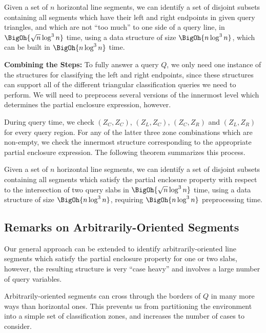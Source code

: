 \begin{lemma}
\label{lem:slabs:two:step3}
Given a set of $n$ horizontal line segments, we can identify a set of disjoint subsets containing all segments which have their left and right endpoints in given query triangles, and which are not ``too much'' to one side of a query line, in $\BigOh{\sqrt{n}\log^3{n}}$ time, using a data structure of size $\BigOh{n\log^3{n}}$, which can be built in $\BigOh{n\log^3{n}}$ time.
\end{lemma}


{\bf Combining the Steps:}
To fully answer a query $Q$, we only need one instance of the structures for classifying the left and right endpoints, since these structures can support all of the different triangular classification queries we need to perform.
We will need to preprocess several versions of the innermost level which determines the partial enclosure expression, however.

During query time, we check $(Z_C, Z_C)$, $(Z_L, Z_C)$, $(Z_C, Z_R)$ and $(Z_L, Z_R)$ for every query region. 
For any of the latter three zone combinations which are non-empty, we check the innermost structure corresponding to the appropriate partial enclosure expression.
The following theorem summarizes this process.

\begin{theorem}
\label{th:slabs:two}
Given a set of $n$ horizontal line segments, we can identify a set of disjoint subsets containing all segments which satisfy the partial enclosure property with respect to the intersection of two query slabs in $\BigOh{\sqrt{n}\log^3{n}}$ time, using a data structure of size $\BigOh{n\log^3{n}}$, requiring $\BigOh{n\log^3{n}}$ preprocessing time.
\end{theorem}


\subsection{Remarks on Arbitrarily-Oriented Segments}
\label{:slabs:remarks}

Our general approach can be extended to identify arbitrarily-oriented line segments which satisfy the partial enclosure property for one or two slabs, however, the resulting structure is very ``case heavy'' and involves a large number of query variables.

Arbitrarily-oriented segments can cross through the borders of $Q$ in many more ways than horizontal ones.
This prevents us from partitioning the environment into a simple set of classification zones, and increases the number of cases to consider.

